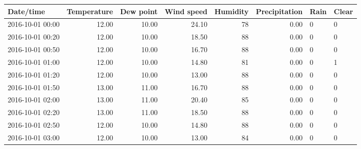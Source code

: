 \begin{tabular}{lrrrrrll}
 Date/time & Temperature & Dew point & Wind speed & Humidity & Precipitation & Rain & Clear \\ 
  \hline
\hline
2016-10-01 00:00 & 12.00 & 10.00 & 24.10 &  78 & 0.00 & 0 & 0 \\ 
   \hline
2016-10-01 00:20 & 12.00 & 10.00 & 18.50 &  88 & 0.00 & 0 & 0 \\ 
   \hline
2016-10-01 00:50 & 12.00 & 10.00 & 16.70 &  88 & 0.00 & 0 & 0 \\ 
   \hline
2016-10-01 01:00 & 12.00 & 10.00 & 14.80 &  81 & 0.00 & 0 & 1 \\ 
   \hline
2016-10-01 01:20 & 12.00 & 10.00 & 13.00 &  88 & 0.00 & 0 & 0 \\ 
   \hline
2016-10-01 01:50 & 13.00 & 11.00 & 16.70 &  88 & 0.00 & 0 & 0 \\ 
   \hline
2016-10-01 02:00 & 13.00 & 11.00 & 20.40 &  85 & 0.00 & 0 & 0 \\ 
   \hline
2016-10-01 02:20 & 13.00 & 11.00 & 18.50 &  88 & 0.00 & 0 & 0 \\ 
   \hline
2016-10-01 02:50 & 12.00 & 10.00 & 14.80 &  88 & 0.00 & 0 & 0 \\ 
   \hline
2016-10-01 03:00 & 12.00 & 10.00 & 13.00 &  84 & 0.00 & 0 & 0 \\ 
  \end{tabular}
